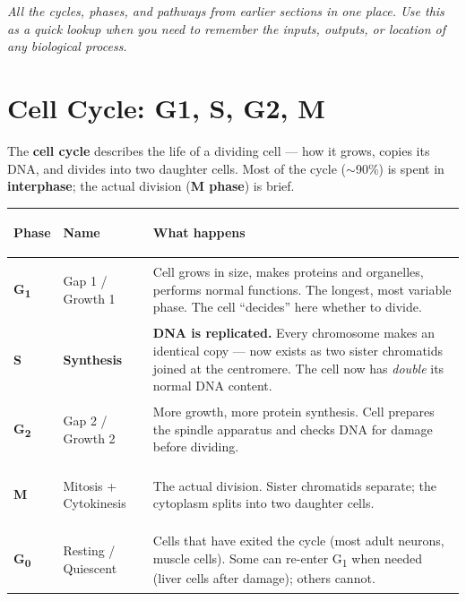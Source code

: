\documentclass[11pt, letterpaper]{article}
\begin{document}
\vspace{6pt}
\begin{center}\small\itshape
  All the cycles, phases, and pathways from earlier sections in one place.
  Use this as a quick lookup when you need to remember the inputs, outputs,
  or location of any biological process.
\end{center}

\section*{Cell Cycle: G1, S, G2, M}

The \textbf{cell cycle} describes the life of a dividing cell --- how it grows, copies its
DNA, and divides into two daughter cells. Most of the cycle ($\sim$90\%) is spent in
\textbf{interphase}; the actual division (\textbf{M phase}) is brief.

\noindent
{\renewcommand{\arraystretch}{1.6}
\begin{tabularx}{\textwidth}{>{\bfseries\centering\arraybackslash}p{1.5cm}
                              >{\bfseries\raggedright\arraybackslash}p{3cm}
                              >{\raggedright\arraybackslash}X}
\toprule
\rowcolor{tableheaderteal}
\textbf{Phase} & \textbf{Name} & \textbf{What happens} \\
\midrule
\rowcolor{rowTe} G\textsubscript{1} & Gap 1 / Growth 1 & Cell grows in size, makes proteins and organelles, performs normal functions. The longest, most variable phase. The cell ``decides'' here whether to divide. \\
\rowcolor{rowA}  \textbf{S} & \textbf{Synthesis} & \textbf{DNA is replicated.} Every chromosome makes an identical copy --- now exists as two sister chromatids joined at the centromere. The cell now has \emph{double} its normal DNA content. \\
\rowcolor{rowTe} G\textsubscript{2} & Gap 2 / Growth 2 & More growth, more protein synthesis. Cell prepares the spindle apparatus and checks DNA for damage before dividing. \\
\rowcolor{rowA}  M & Mitosis + Cytokinesis & The actual division. Sister chromatids separate; the cytoplasm splits into two daughter cells. \\
\rowcolor{rowTe} G\textsubscript{0} & Resting / Quiescent & Cells that have exited the cycle (most adult neurons, muscle cells). Some can re-enter G\textsubscript{1} when needed (liver cells after damage); others cannot. \\
\bottomrule
\end{tabularx}}
\end{document}
